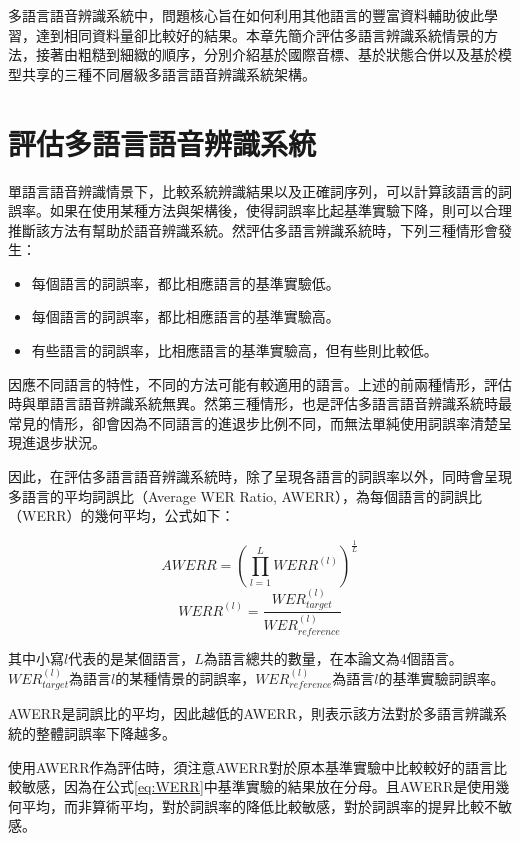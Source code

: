 多語言語音辨識系統中，問題核心旨在如何利用其他語言的豐富資料輔助彼此學習，達到相同資料量卻比較好的結果。本章先簡介評估多語言辨識系統情景的方法，接著由粗糙到細緻的順序，分別介紹基於國際音標、基於狀態合併以及基於模型共享的三種不同層級多語言語音辨識系統架構。

\section{評估多語言語音辨識系統}
單語言語音辨識情景下，比較系統辨識結果以及正確詞序列，可以計算該語言的詞誤率。如果在使用某種方法與架構後，使得詞誤率比起基準實驗下降，則可以合理推斷該方法有幫助於語音辨識系統。然評估多語言辨識系統時，下列三種情形會發生：
\begin{itemize}
 \itemsep -2pt
 \item 每個語言的詞誤率，都比相應語言的基準實驗低。
 \item 每個語言的詞誤率，都比相應語言的基準實驗高。
 \item 有些語言的詞誤率，比相應語言的基準實驗高，但有些則比較低。
\end{itemize}
因應不同語言的特性，不同的方法可能有較適用的語言。上述的前兩種情形，評估時與單語言語音辨識系統無異。然第三種情形，也是評估多語言語音辨識系統時最常見的情形，卻會因為不同語言的進退步比例不同，而無法單純使用詞誤率清楚呈現進退步狀況。

因此，在評估多語言語音辨識系統時，除了呈現各語言的詞誤率以外，同時會呈現多語言的平均詞誤比（Average WER Ratio, AWERR），為每個語言的詞誤比（WERR）的幾何平均，公式如下：

\begin{equation}\label{eq:AWERR}
AWERR = ( \prod_{l=1}^{L} {WERR^{(l)}} )^{\frac{1}{L}}
\end{equation}
\begin{equation}\label{eq:WERR}
WERR^{(l)} = \frac{WER_{target}^{(l)}}{WER_{reference}^{(l)}}
\end{equation}

其中小寫$l$代表的是某個語言，$L$為語言總共的數量，在本論文為4個語言。$WER_{target}^{(l)}$為語言$l$的某種情景的詞誤率，$WER_{reference}^{(l)}$為語言$l$的基準實驗詞誤率。

AWERR是詞誤比的平均，因此越低的AWERR，則表示該方法對於多語言辨識系統的整體詞誤率下降越多。

使用AWERR作為評估時，須注意AWERR對於原本基準實驗中比較較好的語言比較敏感，因為在公式\ref{eq:WERR}中基準實驗的結果放在分母。且AWERR是使用幾何平均，而非算術平均，對於詞誤率的降低比較敏感，對於詞誤率的提昇比較不敏感。

